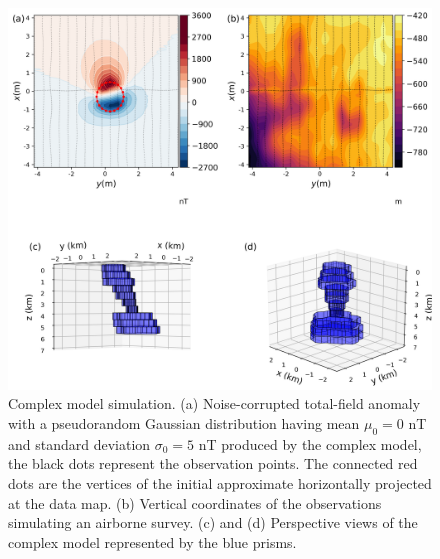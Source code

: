 \begin{figure}
    \centering
    \includegraphics[scale=.5]{figures/complex_model_data.png}
    \caption{Complex model simulation. (a) Noise-corrupted total-field anomaly with a pseudorandom Gaussian distribution having mean $\mu_0 = 0$ nT and standard deviation $\sigma_0 = 5$ nT produced by the complex model, the black dots represent the observation points. The connected red dots are the vertices of the initial approximate horizontally projected at the data map. (b) Vertical coordinates of the observations  simulating an airborne survey. (c) and (d) Perspective views of the complex model represented by the blue prisms.
}
    \label{fig:complex_model}
\end{figure}

